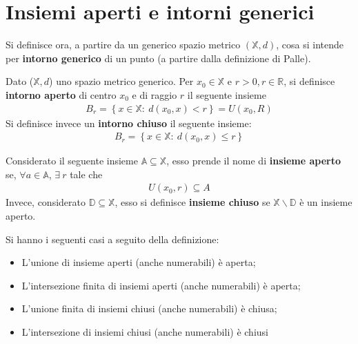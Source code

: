 \documentclass[a4paper, oneside]{book}
\begin{document}
\section{Insiemi aperti e intorni generici}
Si definisce ora, a partire da un generico spazio metrico $(\mathbb{X}, d)$, cosa si intende
per \textbf{intorno generico} di un punto (a partire dalla definizione di Palle).
\begin{definition}
    Dato ($\mathbb{X}, d$) uno spazio metrico generico. Per $x_0 \in \mathbb{X}$ e $r > 0, r \in \mathbb{R}$,
    si definisce \textbf{intorno aperto} di centro $x_0$ e di raggio $r$ il seguente insieme
    \begin{align}
        B_r= \left\{x \in \mathbb{X} :\  d(x_0, x) < r\right\} = U(x_0, R)
    \end{align}
    Si definisce invece un \textbf{intorno chiuso} il seguente insieme: 
    \begin{align}
        B_r= \left\{x \in \mathbb{X} :\  d(x_0, x) \leq r\right\}
    \end{align}
\end{definition}
\begin{definition}
    Considerato il seguente insieme $\mathbb{A} \subseteq  \mathbb{X}$, esso prende il nome di 
    \textbf{insieme aperto} se, $\forall a \in \mathbb{A}$, $\exists \ r$ tale che
    \begin{align}
        U(x_0, r) \subseteq  A
    \end{align}
    Invece, considerato $\mathbb{D} \subseteq \mathbb{X}$, esso si definisce \textbf{insieme chiuso} se $\mathbb{X} \backslash \mathbb{D}$ è un insieme aperto. 
\end{definition}
\begin{theorem}
    Si hanno i seguenti casi a seguito della definizione:
    \begin{itemize}
        \item L'unione di insieme aperti (anche numerabili) è aperta;
        \item L'intersezione finita di insiemi aperti (anche numerabili) è aperta;
        \item L'unione finita di insiemi chiusi (anche numerabili) è chiusa;
        \item L'intersezione di insiemi chiusi (anche numerabili) è chiusi
    \end{itemize}
\end{theorem}
\end{document}
